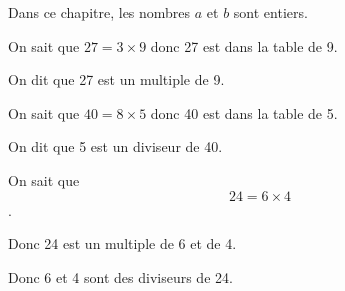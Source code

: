 \documentclass{thecours}
\begin{document}
Dans ce chapitre, les nombres $a$ et $b$ sont entiers.
    \par{}\vskip10pt\noindent
        On sait que $27=3\times9$ donc 27 est dans la table de 9.\par\noindent
        On dit que 27 est un multiple de 9.
    \par{}\vskip10pt\noindent
        On sait que $40=8\times5$ donc 40 est dans la table de 5.\par\noindent
        On dit que 5 est un diviseur de 40.
    \par{}\vskip10pt\noindent
    On sait que $$24=6\times4$$.\par\noindent
    Donc 24 est un multiple de 6 et de 4.\par\noindent
    Donc 6 et 4 sont des diviseurs de 24.
\end{document}
